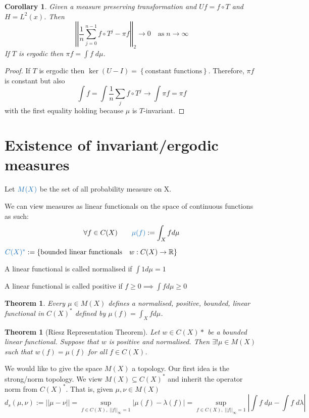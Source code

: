 \documentclass[11pt]{article}
\newcommand{\defeq}{:=}
\newcommand{\abs}[1]{\left|#1\right|}
\newcommand{\norm}[1]{\left|\left|#1\right|\right|}
\newcommand{\R}{\mathbb{R}}
\newenvironment{defin}
	{\begin{mdframed}[backgroundcolor=white, roundcorner=5pt, linewidth=1pt, linecolor=RoyalBlue]}
	{\end{mdframed}}
\newcommand{\mdf}[1]{{\color{RoyalBlue} #1}}
\newtheorem{theorem}[prop]{Theorem}
\newtheorem{cor}[prop]{Corollary}
\begin{document}
\begin{cor}
	Given a measure preserving transformation and $Uf=f\circ T$ and $H=L^2(x)$. Then
	\[
		\norm{\frac{1}{n}\sum_{j=0}^{n-1}f\circ T^j - \pi f}_2 \to 0 \quad \text{as} \; n\to\infty
	\]
	If $T$ is ergodic then $\pi f = \int f\; d\mu$.
\end{cor}

\begin{proof}
If $T$ is ergodic then $\ker(U-I)=\left\{ \text{constant functions}\right\}$.
Therefore, $\pi f$ is constant but also
\[
	 \int f = \int \frac{1}{n}\sum_{j}f\circ T^j  \to \int \pi f = \pi f
\]
with the first equality holding because $\mu$ is $T$-invariant.
\end{proof}

\section{Existence of invariant/ergodic measures}
\begin{defin}
Let $\mdf{M(X)}$ be the set of all probability measure on X.

We can view measures as linear functionals on the space of continuous functions as such:
$$\forall f\in C(X)\quad\quad \mdf{\mu(f)}\defeq\int_X f d\mu$$

$\mdf{C(X)^*}\defeq\{\text{bounded linear functionals}\quad w:C(X)\to\R\}$

A linear functional is called \mdf{normalised} if $\int 1 d\mu =1$

A linear functional is called \mdf{positive} if $f\geq 0\implies \int f d\mu \geq 0$
\end{defin}
\begin{theorem}
	Every $\mu\in M(X)$ defines a normalised, positive, bounded, linear functional in $C(X)^*$ defined by $\mu(f)=\int_X f d\mu$.
\end{theorem}
\begin{theorem}[Riesz Representation Theorem]
	Let $w\in C(X)*$ be a bounded linear functional. Suppose that $w$ is positive and normalised. Then $\exists !\mu\in M(X)$ such that $w(f)=\mu(f)$ for all $f\in C(X)$.
\end{theorem}

We would like to give the space $M(X)$ a topology.
Our first idea is the \mdf{strong/norm topology}.
We view $M(X) \subseteq C(X)^\ast$ and inherit the operator norm from $C(X)^\ast$.
That is, given $\mu, \nu \in M(X)$
\[
	d_s(\mu, \nu) \defeq \norm{\mu - \nu} = \sup_{f\in C(X) , \; \norm{f}_\infty=1}\abs{\mu(f)- \lambda(f)} = \sup_{f\in C(X) , \; \norm{f}_\infty=1} \abs{\int f \;d\mu - \int f \; d\lambda}
\]
\end{document}
